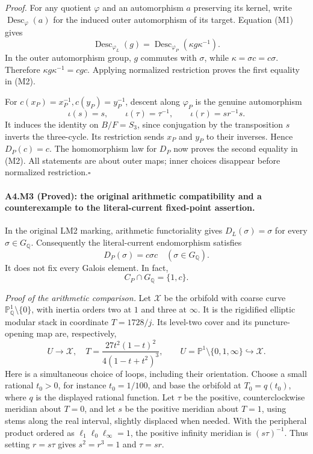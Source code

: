 \emph{Proof.} For any quotient $\varphi$ and an automorphism $a$
preserving its kernel, write $\operatorname{Desc}_{\varphi}(a)$ for
the induced outer automorphism of its target. Equation (M1) gives
\[
 \operatorname{Desc}_{\varphi_L}(g)
 =\operatorname{Desc}_{\varphi_P}(\kappa g\kappa^{-1}).
\]
In the outer automorphism group, $g$ commutes with $\sigma$, while
$\kappa=\sigma c=c\sigma$. Therefore
$\kappa g\kappa^{-1}=cgc$. Applying normalized restriction proves
the first equality in (M2).

For $c(x_P)=x_P^{-1},c(y_P)=y_P^{-1}$, descent along $\varphi_P$
is the genuine automorphism
\[
 \iota(s)=s,\qquad\iota(\tau)=\tau^{-1},\qquad
 \iota(r)=sr^{-1}s.
\]
It induces the identity on $B/F=S_3$, since conjugation by the
transposition $s$ inverts the three-cycle. Its restriction sends
$x_P$ and $y_P$ to their inverses. Hence $D_P(c)=c$.
The homomorphism law for $D_P$ now proves the second equality in (M2).
All statements are about outer maps; inner choices disappear before
normalized restriction.\hfill$\square$

\paragraph{A4.M3 (Proved): the original arithmetic compatibility and a counterexample to the literal-current fixed-point assertion.}
In the original LM2 marking, arithmetic functoriality gives
$D_L(\sigma)=\sigma$ for every $\sigma\in G_{\mathbb Q}$.
Consequently the literal-current endomorphism satisfies
\[
                   D_P(\sigma)=c\sigma c
                   \quad(\sigma\in G_{\mathbb Q}).              \tag{M3}
\]
It does not fix every Galois element. In fact,
\[
                  C_P\cap G_{\mathbb Q}=\{1,c\}.
\]

\emph{Proof of the arithmetic comparison.} Let $\mathcal X$ be the
orbifold with coarse curve $\mathbb P^1_{\mathbb Q}\setminus\{0\}$,
with inertia orders two at $1$ and three at $\infty$. It is the
rigidified elliptic modular stack in coordinate $T=1728/j$.
Its level-two cover and its puncture-opening map are, respectively,
\[
 U\longrightarrow\mathcal X,\quad
 T=\frac{27t^2(1-t)^2}{4(1-t+t^2)^3},
 \qquad
 U=\mathbb P^1\setminus\{0,1,\infty\}\hookrightarrow\mathcal X.
\]
Here is a simultaneous choice of loops, including their orientation.
Choose a small rational $t_0>0$, for instance $t_0=1/100$, and base
the orbifold at $T_0=q(t_0)$, where $q$ is the displayed rational
function. Let $\tau$ be the positive, counterclockwise meridian
about $T=0$, and let $s$ be the positive meridian about $T=1$,
using stems along the real interval, slightly displaced when needed.
With the peripheral product ordered as $\ell_1\ell_0\ell_\infty=1$,
the positive infinity meridian is $(s\tau)^{-1}$. Thus setting
$r=s\tau$ gives $s^2=r^3=1$ and $\tau=sr$.

